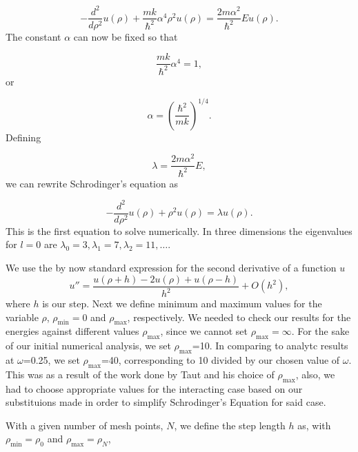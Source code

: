 \documentclass{article}
\begin{document}
\begin{equation*}
  -\frac{d^2}{d\rho^2} u(\rho) 
       + \frac{mk}{\hbar^2} \alpha^4\rho^2u(\rho)  = \frac{2m\alpha^2}{\hbar^2}E u(\rho) .
\end{equation*}
The constant $\alpha$ can now be fixed so that

\begin{equation*}
\frac{mk}{\hbar^2} \alpha^4 = 1,
\end{equation*}
or

\begin{equation*}
\alpha = \left(\frac{\hbar^2}{mk}\right)^{1/4}.
\end{equation*}
Defining

\begin{equation*}
\lambda = \frac{2m\alpha^2}{\hbar^2}E,
\end{equation*}
we can rewrite Schrodinger's equation as

\begin{equation*}
  -\frac{d^2}{d\rho^2} u(\rho) + \rho^2u(\rho)  = \lambda u(\rho) .
\end{equation*}
This is the first equation to solve numerically. In three dimensions the eigenvalues for $l=0$ are 
$\lambda_0=3,\lambda_1=7,\lambda_2=11,\dots .$

We use the by now standard expression for the second derivative of a function $u$
\begin{equation}
    u''=\frac{u(\rho+h) -2u(\rho) +u(\rho-h)}{h^2} +O(h^2),
    \label{eq:diffoperation}
\end{equation}
where $h$ is our step.
Next we define minimum and maximum values for the variable $\rho$,
$\rho_{\mathrm{min}}=0$  and $\rho_{\mathrm{max}}$, respectively. We needed to check our results for the energies against different values $\rho_{\mathrm{max}}$, since we cannot set $\rho_{\mathrm{max}}=\infty$. For the sake of our initial numerical analysis, we set $\rho_{\mathrm{max}}$=10. In comparing to analytc results at $\omega$=0.25, we set $\rho_{\mathrm{max}}$=40, corresponding to 10 divided by our chosen value of $\omega$. This was as a result of the work done by Taut \cite{journal} and his choice of $\rho_{\mathrm{max}}$, also, we had to choose appropriate values for the interacting case based on our substituions made in order to simplify Schrodinger's Equation for said case.

With a given number of mesh points, $N$, we define the step length $h$ as, with $\rho_{\mathrm{min}}=\rho_0$  and $\rho_{\mathrm{max}}=\rho_N$,
\end{document}
